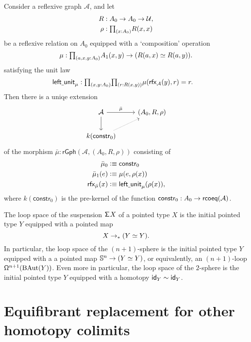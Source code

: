 \begin{thm}
Consider a reflexive graph $\mathcal{A}$, and let
\begin{align*}
R & : A_0 \to A_0 \to\UU, \\
\rho & : \prd{x:A_0}R(x,x)
\end{align*}
be a reflexive relation on $A_0$ equipped with a `composition' operation
\begin{equation*}
\mu:\prd{a,x,y:\pts{A}} \edg{A}(x,y) \to (\eqv{R(a,x)}{R(a,y)}).
\end{equation*}
satisfying the unit law
\begin{align*}
\mathsf{left\usc{}unit}_\mu & : \prd{x,y:\pts{A}}{r:R(x,y)} \mu(\rfx{\mathcal{A}}(y),r)=r.
\end{align*}
Then there is a uniqe extension
\begin{equation*}
\begin{tikzcd}
\mathcal{A} \arrow[r,"\bar{\mu}"] \arrow[d] & (A_0,R,\rho) \\
k(\mathsf{constr}_0) \arrow[ur,densely dotted]
\end{tikzcd}
\end{equation*}
of the morphism $\bar{\mu}:\mathsf{rGph}(\mathcal{A},(A_0,R,\rho))$ consisting of
\begin{align*}
\pts{\bar{\mu}} & \defeq \mathsf{constr}_0 \\
\edg{\bar{\mu}}(e) & \defeq \mu(e,\rho(x)) \\
\rfx{\bar{\mu}}(x) & \defeq \mathsf{left\usc{}unit}_\mu(\rho(x)),
\end{align*}
where $k(\mathsf{constr}_0)$ is the pre-kernel of the function $\mathsf{constr}_0:A_0\to\rcoeq(\mathcal{A})$.
\end{thm}

\begin{cor}
The loop space of the suspension $\susp X$ of a pointed type $X$ is the initial pointed type $Y$ equipped with a pointed map 
\begin{equation*}
X\to_\ast (\eqv{Y}{Y}).
\end{equation*}
In particular, the loop space of the $(n+1)$-sphere is the initial pointed type $Y$ equipped with a a pointed map $\sphere{n}\to (\eqv{Y}{Y})$, or equivalently, an $(n+1)$-loop $\loopspace[n+1]{\mathrm{BAut}(Y)}$. Even more in particular, the loop space of the $2$-sphere is the initial pointed type $Y$ equipped with a homotopy $\idfunc[Y]\htpy\idfunc[Y]$. 
\end{cor}

\section{Equifibrant replacement for other homotopy colimits}

